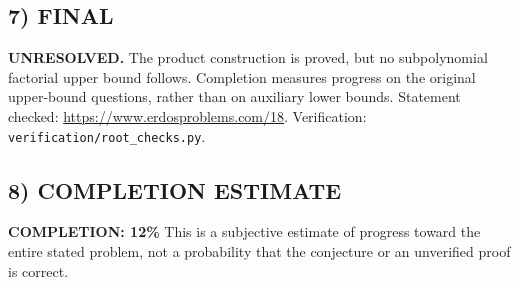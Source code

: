 \subsection*{7) FINAL}
\textbf{UNRESOLVED.} The product construction is proved, but no subpolynomial factorial upper bound follows. Completion measures progress on the original upper-bound questions, rather than on auxiliary lower bounds.
\noindent Statement checked: \url{https://www.erdosproblems.com/18}. Verification: \texttt{verification/root\_checks.py}.

\subsection*{8) COMPLETION ESTIMATE}
\textbf{COMPLETION: 12\%}
This is a subjective estimate of progress toward the entire stated problem, not a probability that the conjecture or an unverified proof is correct.
